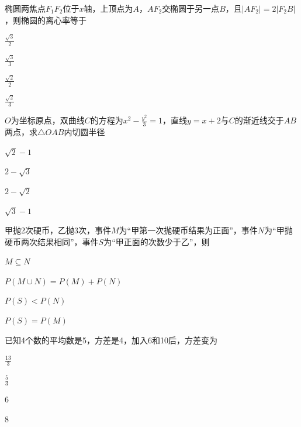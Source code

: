 \documentclass{exam-zh}
\begin{document}
\begin{question}
  椭圆两焦点$F_1F_2$位于$x$轴，上顶点为$A$，$AF_2$交椭圆于另一点$B$，且$|AF_2|=2|F_2B|$，则椭圆的离心率等于 \paren

  \begin{choices}
    \item $\frac{\sqrt 3}2$
    \item $\frac{\sqrt 3}3$
    \item $\frac{\sqrt 2}2$
    \item $\frac{\sqrt 2}3$
  \end{choices}
\end{question}

\begin{question}
  $O$为坐标原点，双曲线$C$的方程为$x^2-\frac{y^2}3=1$，直线$y=x+2$与$C$的渐近线交于$AB$两点，求$\triangle OAB$内切圆半径 \paren

  \begin{choices}
    \item $\sqrt 2-1$
    \item $2-\sqrt3$
    \item $2-\sqrt2$
    \item $\sqrt3-1$
  \end{choices}
\end{question}

\begin{question}
  甲抛2次硬币，乙抛3次，事件$M$为“甲第一次抛硬币结果为正面”，事件$N$为“甲抛硬币两次结果相同”，事件$S$为“甲正面的次数少于乙”，则 \paren

  \begin{choices}
    \item $M\subseteq N$
    \item $P(M\cup N)=P(M)+P(N)$
    \item $P(S)<P(N)$
    \item $P(S)=P(M)$
  \end{choices}
\end{question}

\begin{question}
  已知4个数的平均数是5，方差是4，加入6和10后，方差变为 \paren

  \begin{choices}
    \item $\frac{13}3$
    \item $\frac53$
    \item 6
    \item 8
  \end{choices}
\end{question}
\end{document}
